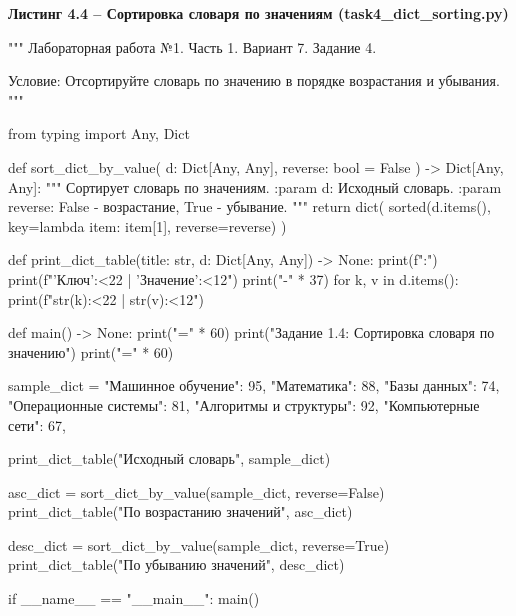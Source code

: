 \documentclass[14pt,a4paper]{extarticle}
\newcommand{\listingtitle}[1]{%
  \par\vspace{8pt}%
  \noindent\hspace*{1.25cm}\textbf{#1}\par\vspace{2pt}%
}
\begin{document}
\listingtitle{Листинг 4.4 -- Сортировка словаря по значениям (task4\_dict\_sorting.py)}
\begin{CodeListing}
"""
Лабораторная работа №1. Часть 1.
Вариант 7. Задание 4.

Условие:
Отсортируйте словарь по значению в порядке возрастания и убывания.
"""

from typing import Any, Dict


def sort_dict_by_value(
    d: Dict[Any, Any], reverse: bool = False
) -> Dict[Any, Any]:
    """
    Сортирует словарь по значениям.
    :param d: Исходный словарь.
    :param reverse: False - возрастание, True - убывание.
    """
    return dict(
        sorted(d.items(), key=lambda item: item[1], reverse=reverse)
    )


def print_dict_table(title: str, d: Dict[Any, Any]) -> None:
    print(f":")
    print(f"{'Ключ':<22} | {'Значение':<12}")
    print("-" * 37)
    for k, v in d.items():
        print(f"{str(k):<22} | {str(v):<12}")


def main() -> None:
    print("=" * 60)
    print("Задание 1.4: Сортировка словаря по значению")
    print("=" * 60)

    sample_dict = {
        "Машинное обучение": 95,
        "Математика": 88,
        "Базы данных": 74,
        "Операционные системы": 81,
        "Алгоритмы и структуры": 92,
        "Компьютерные сети": 67,
    }

    print_dict_table("Исходный словарь", sample_dict)

    asc_dict = sort_dict_by_value(sample_dict, reverse=False)
    print_dict_table("По возрастанию значений", asc_dict)

    desc_dict = sort_dict_by_value(sample_dict, reverse=True)
    print_dict_table("По убыванию значений", desc_dict)


if __name__ == "__main__":
    main()
\end{CodeListing}
\end{document}
